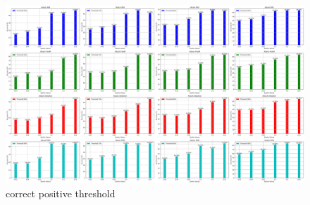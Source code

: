 \documentclass[10pt, conference, a4paper, final]{IEEEtran}
\begin{document}
            \begin{figure}
                \centering
                \includegraphics[width=\linewidth]{paper_images/correct positive threshold.png}
                \caption{correct positive threshold}
                \label{fig:fgsm}
            \end{figure}
         
        
\end{document}
